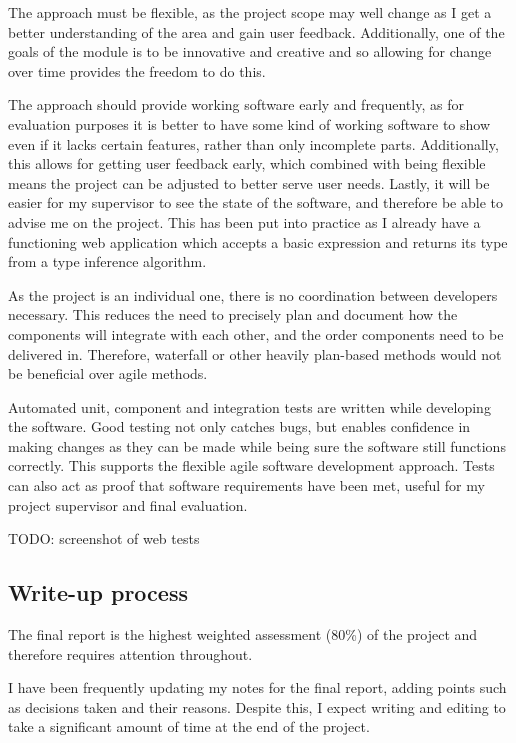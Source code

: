 \documentclass[12pt]{article}
\begin{document}
The approach must be flexible, as the project scope may well change as I get a better understanding of the area and gain user feedback. Additionally, one of the goals of the module is to be innovative and creative\cite{ref14} and so allowing for change over time provides the freedom to do this.

The approach should provide working software early and frequently, as for evaluation purposes it is better to have some kind of working software to show even if it lacks certain features, rather than only incomplete parts. Additionally, this allows for getting user feedback early, which combined with being flexible means the project can be adjusted to better serve user needs. Lastly, it will be easier for my supervisor to see the state of the software, and therefore be able to advise me on the project. This has been put into practice as I already have a functioning web application which accepts a basic expression and returns its type from a type inference algorithm.

As the project is an individual one, there is no coordination between developers necessary. This reduces the need to precisely plan and document how the components will integrate with each other, and the order components need to be delivered in. Therefore, waterfall or other heavily plan-based methods would not be beneficial over agile methods.

Automated unit, component and integration tests are written while developing the software. Good testing not only catches bugs, but enables confidence in making changes as they can be made while being sure the software still functions correctly. This supports the flexible agile software development approach. Tests can also act as proof that software requirements have been met, useful for my project supervisor and final evaluation.

TODO: screenshot of web tests

\subsection{Write-up process}

The final report is the highest weighted assessment (80\%) of the project and therefore requires attention throughout.

I have been frequently updating my notes for the final report, adding points such as decisions taken and their reasons. Despite this, I expect writing and editing to take a significant amount of time at the end of the project.
\end{document}
